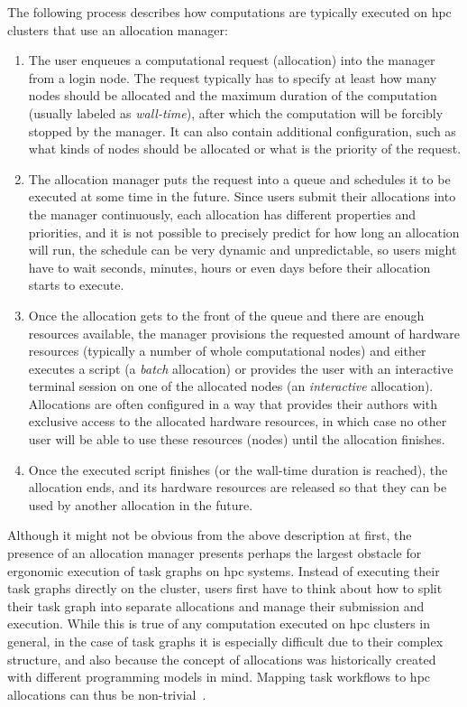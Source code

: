 The following process describes how computations are typically executed on \gls{hpc}
clusters that use an allocation manager:

\begin{enumerate}
	\item The user enqueues a computational request (allocation) into the manager from a login node. The
	      request typically has to specify at least how many nodes should be allocated and the maximum
	      duration of the computation (usually labeled as \emph{wall-time}), after which the computation
	      will be forcibly stopped by the manager. It can also contain additional configuration, such as what
	      kinds of nodes should be allocated or what is the priority of the request.
	\item The allocation manager puts the request into a queue and schedules it to be executed at some time
	      in the future. Since users submit their allocations into the manager continuously, each allocation
	      has different properties and priorities, and it is not possible to precisely predict for how long
	      an allocation will run, the schedule can be very dynamic and unpredictable, so users might have to
	      wait seconds, minutes, hours or even days before their allocation starts to execute.
	\item Once the allocation gets to the front of the queue and there are enough resources available, the
	      manager provisions the requested amount of hardware resources (typically a number of whole
	      computational nodes) and either executes a script (a \emph{batch} allocation) or provides
	      the user with an interactive terminal session on one of the allocated nodes (an
	      \emph{interactive} allocation). Allocations are often configured in a way that provides their
	      authors with exclusive access to the allocated hardware resources, in which case no other user will
	      be able to use these resources (nodes) until the allocation finishes.
	\item Once the executed script finishes (or the wall-time duration is reached), the allocation ends, and
	      its hardware resources are released so that they can be used by another allocation in the future.
\end{enumerate}

Although it might not be obvious from the above description at first, the presence of an allocation
manager presents perhaps the largest obstacle for ergonomic execution of task graphs on
\gls{hpc} systems. Instead of executing their task graphs directly on the cluster,
users first have to think about how to split their task graph into separate allocations and manage
their submission and execution. While this is true of any computation executed on
\gls{hpc} clusters in general, in the case of task graphs it is especially difficult
due to their complex structure, and also because the concept of allocations was historically
created with different programming models in mind. Mapping task workflows to \gls{hpc}
allocations can thus be non-trivial~\cite{glume,slurm-workflow}.

